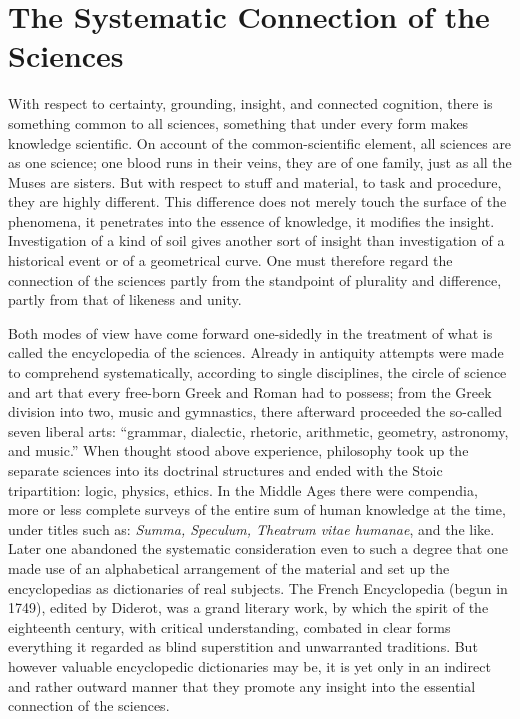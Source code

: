 \documentclass[12pt]{book}
\begin{document}
\section{The Systematic Connection of the Sciences}
\label{sec:9}

\noindent With respect to certainty, grounding, insight, and connected
cognition, there is something common to all sciences, something that under
every form makes knowledge scientific. On account of the common-scientific
element, all sciences are as one science; one blood runs in their veins, they
are of one family, just as all the Muses are sisters. But with respect to stuff
and material, to task and procedure, they are highly different. This difference
does not merely touch the surface of the phenomena, it penetrates into the
essence of knowledge, it modifies the insight. Investigation of a kind of soil
gives another sort of insight than investigation of a historical event or of a
geometrical curve. One must therefore regard the connection of the sciences
partly from the standpoint of plurality and difference, partly from that of
likeness and unity.

Both modes of view have come forward one-sidedly in the treatment of what is
called the encyclopedia of the sciences. Already in antiquity attempts were
made to comprehend systematically, according to single disciplines, the circle
of science and art that every free-born Greek and Roman had to possess; from
the Greek division into two, music and gymnastics, there afterward proceeded
the so-called seven liberal arts: ``grammar, dialectic, rhetoric, arithmetic,
geometry, astronomy, and music.'' When thought stood above experience,
philosophy took up the separate sciences into its doctrinal structures and ended
with the Stoic tripartition: logic, physics, ethics. In the Middle Ages there
were compendia, more or less complete surveys of the entire sum of human
knowledge at the time, under titles such as: \textit{Summa, Speculum, Theatrum
vitae humanae}, and the like. Later one abandoned the systematic consideration
even to such a degree that one made use of an alphabetical arrangement of the
material and set up the encyclopedias as dictionaries of real subjects. The
French Encyclopedia (begun in 1749), edited by Diderot, was a grand literary
work, by which the spirit of the eighteenth century, with critical
understanding, combated in clear forms everything it regarded as blind
superstition and unwarranted traditions. But however valuable encyclopedic
dictionaries may be, it is yet only in an indirect and rather outward manner
that they promote any insight into the essential connection of the sciences.
\end{document}
